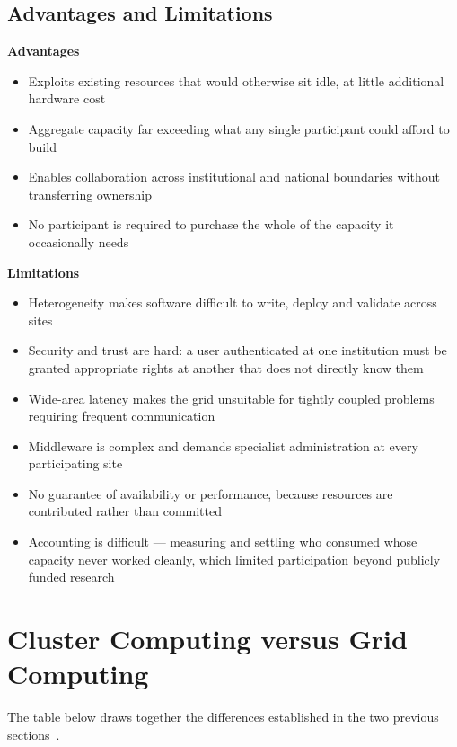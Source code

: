 \documentclass[../main.tex]{subfiles}
\begin{document}
\subsection{Advantages and Limitations}

\textbf{Advantages}
\begin{itemize}
  \item Exploits existing resources that would otherwise sit idle, at little
        additional hardware cost
  \item Aggregate capacity far exceeding what any single participant could
        afford to build
  \item Enables collaboration across institutional and national boundaries
        without transferring ownership
  \item No participant is required to purchase the whole of the capacity it
        occasionally needs
\end{itemize}

\textbf{Limitations}
\begin{itemize}
  \item Heterogeneity makes software difficult to write, deploy and validate
        across sites
  \item Security and trust are hard: a user authenticated at one institution
        must be granted appropriate rights at another that does not directly
        know them
  \item Wide-area latency makes the grid unsuitable for tightly coupled
        problems requiring frequent communication
  \item Middleware is complex and demands specialist administration at every
        participating site
  \item No guarantee of availability or performance, because resources are
        contributed rather than committed
  \item Accounting is difficult --- measuring and settling who consumed whose
        capacity never worked cleanly, which limited participation beyond
        publicly funded research
\end{itemize}

\section{Cluster Computing versus Grid Computing}

The table below draws together the differences established in the two
previous sections~.
\end{document}

